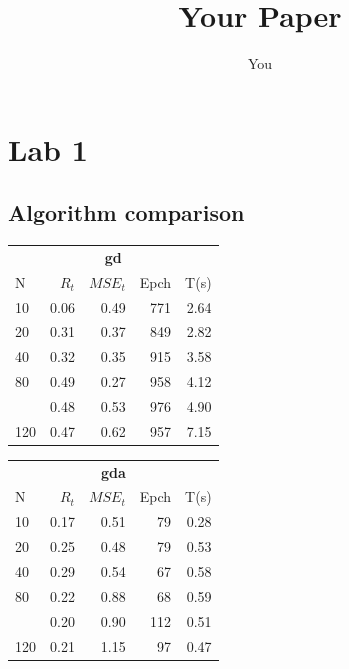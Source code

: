 \documentclass[a4paper, 10pt]{article}
\title{Your Paper}
\author{You}
\begin{document}
\maketitle
\newpage
\section{Lab 1}
\subsection{Algorithm comparison}
  \begin{table}[h!]
    \begin{tabular}{@{}lrrrr@{}}
      \toprule
      \multicolumn{5}{c}{\textbf{gd}} \\
      N  &   $R_t$  &  $MSE_t$ &  Epch  & T(s)\\
      \midrule
      10       &   0.06     &  0.49       &  771     & 2.64   \\
      20       &   0.31     &  0.37       &  849     & 2.82   \\
      40       &   0.32     &  0.35       &  915     & 3.58   \\
      80       &   0.49     &  0.27       &  958     & 4.12   \\
      \hdashline
      100      &   0.48     &  0.53       &  976     & 4.90   \\
      120      &   0.47     &  0.62       &  957     & 7.15   \\
      \bottomrule
    \end{tabular} 
    \hfill
    \begin{tabular}{@{}lrrrr@{}}
      \toprule
      \multicolumn{5}{c}{\textbf{gda}} \\
      N  &   $R_t$  &  $MSE_t$ &  Epch  & T(s)\\
      \midrule
      10  & 0.17    & 0.51    & 79      &  0.28   \\
      20  & 0.25    & 0.48    & 79      &  0.53   \\
      40  & 0.29    & 0.54    & 67      &  0.58   \\
      80  & 0.22    & 0.88    & 68      &  0.59   \\                 
      \hdashline
      100 & 0.20    & 0.90    & 112     &  0.51   \\
      120 & 0.21    & 1.15    & 97      &  0.47   \\
      \bottomrule
    \end{tabular} 
    \hfill
    \begin{tabular}{@{}lrrrr@{}}

\end{tabular}
\end{table}
\end{document}
